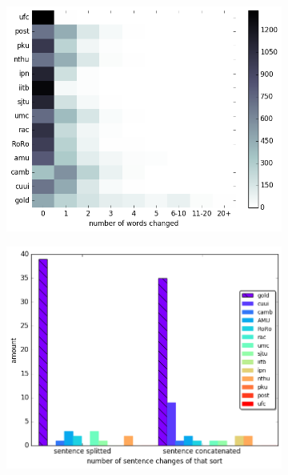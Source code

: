\documentclass[letter,11pt]{article}
\begin{document}
\begin{figure}[tbp]
  \centering
  \begin{subfigure}[]{0.4\textwidth}
    \includegraphics[width = \textwidth]{words_differences_heat}
  \end{subfigure}
  \begin{subfigure}[]{0.4\textwidth}
    \includegraphics[width = \textwidth]{aligned}
  \end{subfigure}
  \begin{subfigure}[]{0.4\textwidth}

\end{subfigure}
\end{figure}
\end{document}
